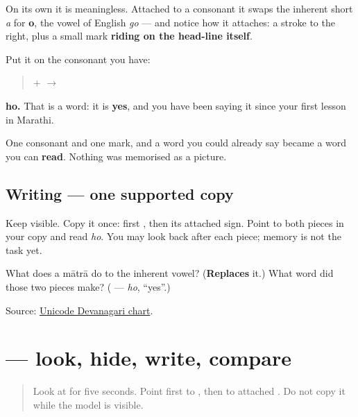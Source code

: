 \begin{quote}
\end{quote}

On its own it is meaningless. Attached to a consonant it swaps the inherent short \emph{a} for \textbf{o}, the vowel of English \emph{go} — and notice how it attaches: a stroke to the right, plus a small mark \textbf{riding on the head-line itself}.

Put it on the consonant you have:

\begin{quote}
\textbf{} + \textbf{} $\to$ \textbf{}
\end{quote}

\textbf{ho.} That is a word: it is \textbf{yes}, and you have been saying it since your first lesson in Marathi.

One consonant and one mark, and a word you could already say became a word you can \textbf{read}. Nothing was memorised as a picture.

\subsection*{Writing — one supported copy}
Keep \textbf{} visible. Copy it once: first \textbf{}, then its attached \textbf{} sign. Point to both pieces in your copy and read \emph{ho}. You may look back after each piece; memory is not the task yet.

\begin{tcolorbox}[breakable,colback=teal!4,colframe=teal!35!black,title={Before you move on}]
What does a mātrā do to the inherent vowel? (\textbf{Replaces} it.) What word did those two pieces make? (\textbf{} — \emph{ho}, \textquotedblleft{}yes\textquotedblright{}.)

Source: \href{https://www.unicode.org/charts/PDF/U0900.pdf}{Unicode Devanagari chart}.
\end{tcolorbox}
\section[ho]{ — look, hide, write, compare}

\label{lesson:MR-W01-ho-delayed-copy}



\begin{quote}
Look at \textbf{} for five seconds. Point first to \textbf{}, then to attached \textbf{}. Do not copy it while the model is visible.
\end{quote}

